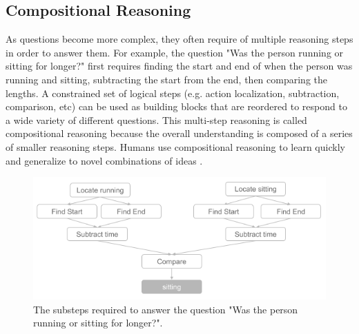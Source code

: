 \documentclass[10pt,twocolumn,letterpaper]{article}
\begin{document}
\subsection{Compositional Reasoning}

As questions become more complex, they often require of multiple reasoning steps in order to answer them. For example, the question "Was the person running or sitting for longer?" first requires finding the start and end of when the person was running and sitting, subtracting the start from the end, then comparing the lengths. A constrained set of logical steps (e.g. action localization, subtraction, comparison, etc) can be used as building blocks that are reordered to respond to a wide variety of different questions. This multi-step reasoning is called compositional reasoning because the overall understanding is composed of a series of smaller reasoning steps. Humans use compositional reasoning to learn quickly and generalize to novel combinations of ideas \cite{tani2014self, lake2018generalization, schulz2016probing}. 


\begin{figure}[t]
\begin{center}
\includegraphics[width=0.8\linewidth]{Figures/figure_composition.png}
\end{center}
   \caption{The substeps required to answer the question "Was the person running or sitting for longer?".}
\label{fig:long}
\label{fig:onecol}
\end{figure}
\end{document}
